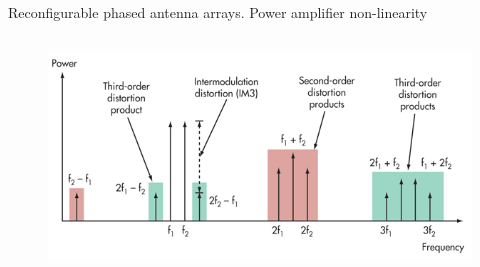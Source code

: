 \documentclass[../main.tex]{subfiles}
\begin{document}
\begin{frame}[t]{Reconfigurable phased antenna arrays. Power amplifier non-linearity}
\begin{columns}[t]
\begin{column}{0.5\textwidth}
{    \begin{figure}[H]
    \begin{adjustbox}{width=1\linewidth}
    \includegraphics{pics/IMD.jpg}
    \end{adjustbox}
    \end{figure}}
\end{column}
\end{columns}

\end{frame}


%
%
\end{document}

